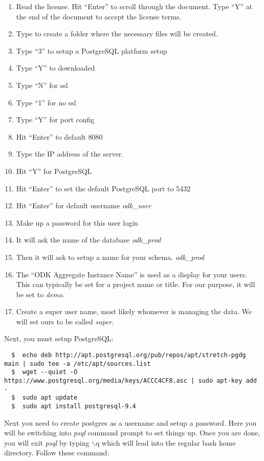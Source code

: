 \begin{enumerate}
\item Read the license. Hit ``Enter'' to scroll through the document. Type ``Y'' at the end of the document to accept the license terms.
\item Type  to create a folder where the necessary files will be created.
\item  Type ``3'' to setup a PostgreSQL platform setup
\item Type ``Y'' to downloaded
\item Type ``N'' for ssl
\item Type ``1'' for no ssl
\item Type ``Y'' for port config
\item Hit ``Enter'' to default 8080
\item Type the IP address of the server.
\item Hit ``Y'' for PostgreSQL
\item Hit ``Enter'' to set the default PostgreSQL port to 5432
\item Hit ``Enter'' for default username \emph{odk\_user}
\item Make up a password for this user login
\item It will ask the name of the database \emph{odk\_prod}
\item Then it will ask to setup a name for your schema. \emph{odk\_prod}
\item The ``ODK Aggregate Instance Name'' is used as a display for your users. This can typically be set for a project name or title. For our purpose, it will be set to
\emph{demo}.
\item Create a super user name, most likely whomever is managing the data. We will set ours to be called \emph{super}.
\end{enumerate}

Next, you must setup PostgreSQL:
\begin{lstlisting}
  $  echo deb http://apt.postgresql.org/pub/repos/apt/stretch-pgdg main | sudo tee -a /etc/apt/sources.list
  $  wget --quiet -O https://www.postgresql.org/media/keys/ACCC4CF8.asc | sudo apt-key add -
  $  sudo apt update
  $  sudo apt install postgresql-9.4
\end{lstlisting}

Next you need to create postgres as a username and setup a password. Here you will be switching into \emph{psql} command prompt to set things up. Once you are done, you will exit \emph{psql} by typing $\backslash$q which will lead into the regular bash home directory. Follow these command:

